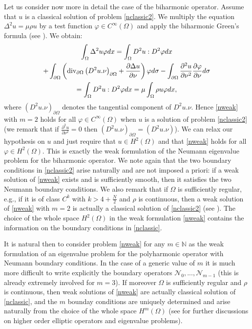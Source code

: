 \documentclass[11pt,a4paper]{amsart}
\numberwithin{equation}{section}
\begin{document}
Let us consider now more in detail the case of the biharmonic operator. Assume that $u$ is a classical solution of problem \eqref{nclassic2}. We multiply the equation $\Delta^2u=\mu\rho u$ by a test function $\varphi\in C^{\infty}(\Omega)$ and apply the biharmonic Green's formula (see \cite[Lemma\,8.56]{arrietalamberti1}). We obtain:
 \begin{multline*}
 \int_\Omega\Delta^2 u\varphi dx=\int_{\Omega}D^2u:D^2\varphi dx\\+\int_{\partial\Omega}\left({\rm div}_{\partial\Omega}\left(D^2u.\nu\right)_{\partial\Omega}+\frac{\partial\Delta u}{\partial\nu}\right)\varphi d\sigma-\int_{\partial\Omega}\frac{\partial^2 u}{\partial\nu^2}\frac{\partial\varphi}{\partial\nu} d\sigma\\
=\int_{\Omega}D^2u:D^2\varphi dx=\mu\int_{\Omega}\rho u\varphi dx,
\end{multline*}
where $(D^2u.\nu)_{\partial\Omega}$ denotes the tangential component of  $D^2u.\nu$. Hence \eqref{nweak} with $m=2$ holds for all $\varphi\in C^{\infty}(\Omega)$ when $u$ is a solution of problem \eqref{nclassic2} (we remark that if $\frac{\partial^2u}{\partial\nu^2}=0$ then $(D^2u.\nu)_{\partial\Omega}=(D^2u.\nu)$). We can relax our hypothesis on $u$ and just require that $u\in H^2(\Omega)$ and that \eqref{nweak} holds for all $\varphi\in H^2(\Omega)$. This is exactly the weak formulation of the Neumann eigenvalue problem for the biharmonic operator. We note again that the two boundary conditions in \eqref{nclassic2} arise naturally and are not imposed a priori: if a weak solution of \eqref{nweak} exists and is sufficiently smooth, then it satisfies the two Neumann boundary conditions. We also remark that if $\Omega$ is sufficiently regular, e.g., if it is of class $C^k$ with $k>4+\frac{N}{2}$ and $\rho$ is continuous,  then a weak solution of \eqref{nweak} with $m=2$ is actually a classical solution of \eqref{nclassic2} (see \cite[\S\,2]{gazzola}). The choice of the whole space $H^2(\Omega)$ in the weak formulation \eqref{nweak} contains the information on the boundary conditions in \eqref{nclassic}. 

It is natural then to consider problem \eqref{nweak} for any $m\in\mathbb N$ as the weak formulation of an eigenvalue problem for the polyharmonic operator with Neumann boundary conditions. In the case of a generic value of $m$ it is much more difficult to write explicitly the boundary operators $\mathcal N_0,...,\mathcal N_{m-1}$ (this is already extremely involved for $m=3$).  If moreover $\Omega$ is sufficiently regular and $\rho$ is continuous, then weak solutions of \eqref{nweak} are actually classical solution of \eqref{nclassic}, and the $m$ bounday conditions are uniquely determined and arise naturally from the choice of the whole space $H^m(\Omega)$ (see \cite{gazzola} for further discussions on higher order elliptic operators and eigenvalue problems).
\end{document}
